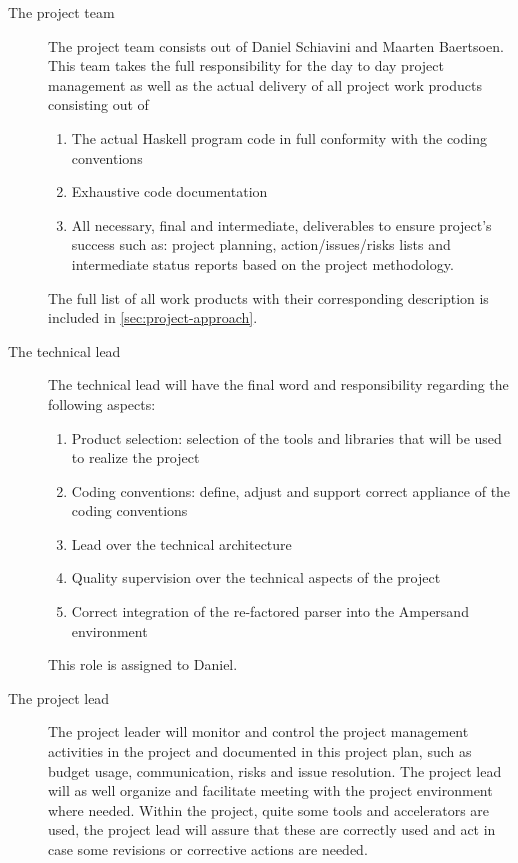 \begin{description}
	\item[The project team]
	The project team consists out of Daniel Schiavini and Maarten Baertsoen.
	This team takes the full responsibility for the day to day project management as well as the actual delivery of all project work products consisting out of
	\begin{enumerate}
		\item The actual Haskell program code in full conformity with the coding conventions
		\item Exhaustive code documentation
		\item All necessary, final and intermediate, deliverables to ensure project's success such as: project planning, action/issues/risks lists and intermediate status reports based on the project methodology.
	\end {enumerate}
	The full list of all work products with their corresponding description is included in \autoref{sec:project-approach}.
	
	\item[The technical lead]

	The technical lead will have the final word and responsibility regarding the following aspects:
	\begin{enumerate}
		\item 	Product selection: selection of the tools and libraries that will be used to realize the project
		\item 	Coding conventions: define, adjust and support correct  appliance of the coding conventions
		\item 	Lead over the technical architecture
		\item 	Quality supervision over the technical aspects of the project
		\item 	Correct integration of the re-factored parser into the Ampersand environment
	\end {enumerate}

	This role is assigned to Daniel.

	\item[The project lead]

	The project leader will monitor and control the project management activities in the project and documented in this project plan, such as budget usage, communication, risks and issue resolution.
	 The project lead will as well organize and facilitate meeting with the project environment where needed. 
Within the project, quite some tools and accelerators are used, the project lead will assure that these are correctly used and act in case some revisions or corrective actions are needed.


\end{description}
